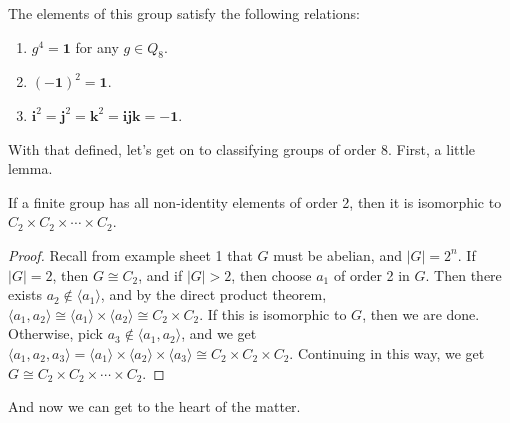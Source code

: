 \documentclass[a4paper]{scrartcl}
\begin{document}
The elements of this group satisfy the following relations:
\begin{enumerate}[label=(\roman*)]
	\item $g^4= \mathbf{1}$ for any $g \in Q_8$.
	\item $(-\mathbf{1})^2 = \mathbf{1}$.
	\item $\mathbf{i}^2 = \mathbf{j}^2 = \mathbf{k}^2 = \mathbf{ijk} = -\mathbf{1}$.
\end{enumerate}

With that defined, let's get on to classifying groups of order 8.
First, a little lemma.

\begin{lemma}
	If a finite group has all non-identity elements of order 2, then it is isomorphic to $C_2 \times C_2 \times \cdots \times C_2$.
\end{lemma}
\begin{proof}
	Recall from example sheet 1 that $G$ must be abelian, and $|G| = 2^n$. If $|G| = 2$, then $G \cong C_2$, and if $|G| > 2$, then choose $a_1$ of order 2 in $G$. Then there exists $a_2 \not \in \langle a_1 \rangle$, and by the direct product theorem, $\langle a_1, a_2 \rangle \cong \langle a_1 \rangle \times \langle a_2 \rangle \cong C_2 \times C_2$.
	If this is isomorphic to $G$, then we are done. Otherwise, pick $a_3 \not \in \langle a_1, a_2 \rangle$, and we get $\langle a_1, a_2, a_3 \rangle = \langle a_1 \rangle \times \langle a_2 \rangle \times \langle a_3 \rangle \cong C_2 \times C_2 \times C_2$. Continuing in this way, we get $G \cong C_2 \times C_2 \times \cdots \times C_2$. 
\end{proof}

And now we can get to the heart of the matter.
\end{document}
